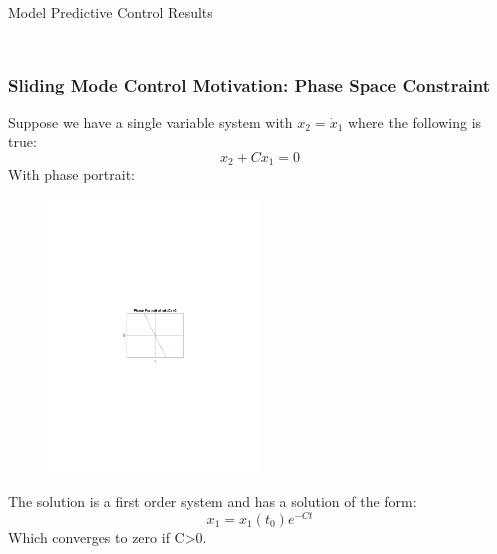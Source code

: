 \documentclass[aspectratio=169]{beamer}
\begin{document}
\begin{frame}{Model Predictive Control Results}
\begin{columns}
\begin{column}{0.5\textwidth}
\begin{figure}
            \end{figure}
        \end{column}
    \end{columns}
\end{frame}

\begin{frame}[t]
    \frametitle{Sliding Mode Control Motivation: Phase Space Constraint}

        Suppose we have a single variable system with $x_2=\dot{x}_1$ where the following is true: $$x_2+Cx_1=0$$ With phase portrait:
        \begin{figure}[htbp]
        \centering
        \includegraphics[trim=4.5cm 11.2cm 3cm 11cm,clip, width=0.5\textwidth]{Phase portrait.pdf}
    \end{figure}
    
    The solution is a first order system and has a solution of the form: $$x_1=x_1(t_0)e^{-Ct}$$ Which converges to zero if C>0.
\end{frame}
\end{document}
